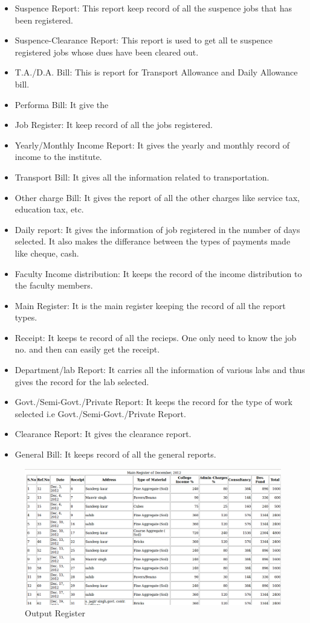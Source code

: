 \begin{itemize}
\item Suspence Report: This report keep record of all the suspence 
jobs that has been registered.
\item Suspence-Clearance Report: This report is used to get all te 
suspence registered jobs whose dues have been cleared out.
\item T.A./D.A. Bill: This is report for Transport Allowance and Daily 
Allowance bill.
\item Performa Bill: It give the 
\item Job Register: It keep record of all the jobs registered.
\item Yearly/Monthly Income Report: It gives the yearly and monthly 
record of income to the institute.
\item Transport Bill: It gives all the information related to 
transportation.
\item Other charge Bill: It gives the report of all the other charges 
like service tax, education tax, etc.
\item Daily report: It gives the information of job registered in  the 
number of days selected. It also makes the differance between the types 
of payments made like cheque, cash.
\item Faculty Income distribution: It keeps the record of the income 
distribution to the faculty members.
\item Main Register: It is the main register keeping the record of all 
the report types.
\item Receipt: It keeps te record of all the recieps. One only need to 
know the job no. and then can easily get the receipt.
\item Department/lab Report: It carries all the information of various 
labs and thus gives the record for the lab selected.
\item Govt./Semi-Govt./Private Report: It keeps the record for the type 
of work selected i.e Govt./Semi-Govt./Private Report.
\item Clearance Report: It gives the clearance report.
\item General Bill: It keeps record of all the general reports.
\end{itemize}

\begin{figure}[h]
\centering \includegraphics[scale=1.0]{images/reg1.png}
\caption{Output Register}
\end{figure}

